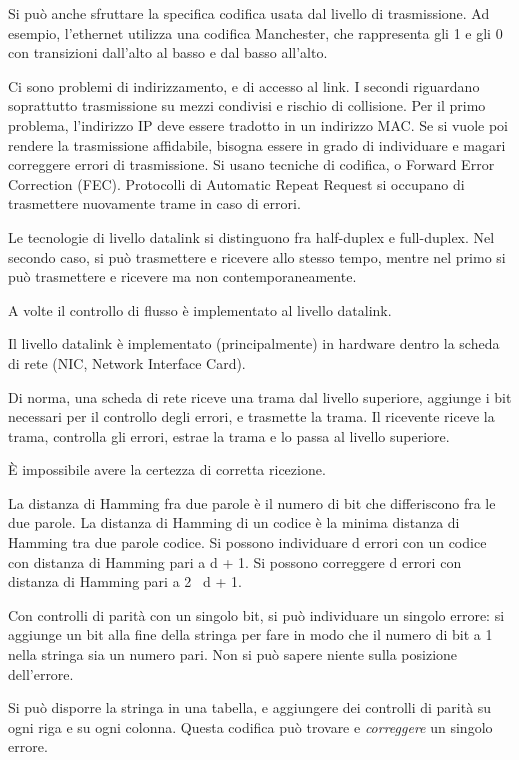 Si pu\`o anche sfruttare la specifica codifica usata dal livello di trasmissione. Ad esempio, l'ethernet utilizza una codifica Manchester, che rappresenta gli 1 e gli 0 con transizioni dall'alto al basso e dal basso all'alto.

Ci sono problemi di indirizzamento, e di accesso al link. I secondi riguardano soprattutto trasmissione su mezzi condivisi e rischio di collisione. Per il primo problema, l'indirizzo IP deve essere tradotto in un indirizzo MAC. Se si vuole poi rendere la trasmissione affidabile, bisogna essere in grado di individuare e magari correggere errori di trasmissione. Si usano tecniche di codifica, o Forward Error Correction (FEC). Protocolli di Automatic Repeat Request si occupano di trasmettere nuovamente trame in caso di errori.

Le tecnologie di livello datalink si distinguono fra half-duplex e full-duplex. Nel secondo caso, si pu\`o trasmettere e ricevere allo stesso tempo, mentre nel primo si pu\`o trasmettere e ricevere ma non contemporaneamente.

A volte il controllo di flusso \`e implementato al livello datalink.

Il livello datalink \`e implementato (principalmente) in hardware dentro la scheda di rete (NIC, Network Interface Card).

Di norma, una scheda di rete riceve una trama dal livello superiore, aggiunge i bit necessari per il controllo degli errori, e trasmette la trama. Il ricevente riceve la trama, controlla gli errori, estrae la trama e lo passa al livello superiore.

\`E impossibile avere la certezza di corretta ricezione. 

La distanza di Hamming fra due parole \`e il numero di bit che differiscono fra le due parole. La distanza di Hamming di un codice \`e la minima distanza di Hamming tra due parole codice. Si possono individuare d errori con un codice con distanza di Hamming pari a d + 1. Si possono correggere d errori con distanza di Hamming pari a 2 \, d + 1.

Con controlli di parit\`a con un singolo bit, si pu\`o individuare un singolo errore: si aggiunge un bit alla fine della stringa per fare in modo che il numero di bit a 1 nella stringa sia un numero pari. Non si pu\`o sapere niente sulla posizione dell'errore.

Si pu\`o disporre la stringa in una tabella, e aggiungere dei controlli di parit\`a su ogni riga e su ogni colonna. Questa codifica pu\`o trovare e \emph{correggere} un singolo errore.

